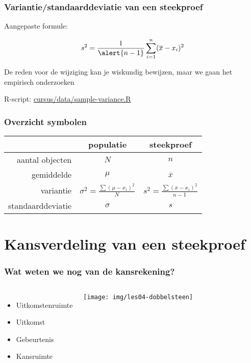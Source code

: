 \documentclass[aspectratio=169]{beamer}
\begin{document}
\begin{frame}[fragile]
  \frametitle{Variantie/standaarddeviatie van een steekproef}

  \begin{center}
    Aangepaste formule:
    
    \begin{equation*}
    s^2 = \frac{1}{\alert{n-1}} \sum_{i=1}^{n} (\overline{x} - x_i)^2
    \end{equation*}
    
    De reden voor de wijziging kan je wiskundig bewijzen, maar we gaan het empirisch onderzoeken

    \vfill

    R-script: \href{https://github.com/HoGentTIN/onderzoekstechnieken-cursus/blob/master/cursus/data/sample-variance.R}{cursus/data/sample-variance.R}
  \end{center}
\end{frame}

\begin{frame}
\frametitle{Overzicht symbolen}


{\tabulinesep=1.2mm
  \begin{center}
    \begin{tabu}{|r|c|c|}
      \hline
      & populatie & steekproef \\
      \hline
      aantal objecten & $N$ & $n$ \\
      \hline
      gemiddelde & $\mu$ & $\overline{x}$ \\
      \hline
      variantie & $\sigma^2 = \frac{\sum (\mu-x_i)^2}{N}$ & $s^2  = \frac{\sum (\overline{x}-x_i)^2}{n-1}$ \\
      \hline
      standaarddeviatie & $\sigma$ & $s$ \\
      \hline
    \end{tabu}
  \end{center}
}
\end{frame}


\section{Kansverdeling van een steekproef}

\begin{frame}
  \frametitle{Wat weten we nog van de kansrekening?}

  \begin{columns}
    \begin{itemize}
      \item Uitkomstenruimte
      \item Uitkomst
      \item Gebeurtenis
      \item Kansruimte
    \end{itemize}

    \centering
    \texttt{[image: img/les04-dobbelsteen]}
  \end{columns}

\end{frame}
\end{document}
